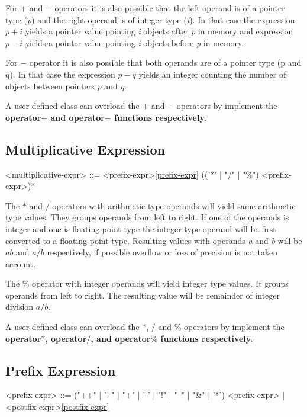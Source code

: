 \documentclass[a4paper,oneside,11pt]{article}
\begin{document}
For $+$ and $-$ operators it is also possible that the left operand is of a pointer type (\emph{p}) and the right operand is of integer type (\emph{i}).
In that case the expression $p+i$ yields a pointer value pointing \emph{i} objects after \emph{p} in memory and
expression $p-i$ yields a pointer value pointing \emph{i} objects before \emph{p} in memory.

For $-$ operator it is also possible that both operands are of a pointer type (p and q).
In that case the expression $p-q$ yields an integer counting the number of objects between pointers \emph{p} and \emph{q}.

A user-defined class can overload the $+$ and $-$ operators by implement
the \bf{operator$+$} and \bf{operator$-$} functions respectively.

\subsection{Multiplicative Expression}

\begin{grammar}
\label{multiplicative-expr}<multiplicative-expr> ::= <prefix-expr>\ref{prefix-expr} (('*' | "/" | "\%") <prefix-expr>)*
\end{grammar}

The $*$ and $/$ operators with arithmetic type operands will yield same arithmetic type values. They groups operands from left to right.
If one of the operands is integer and one is floating-point type the integer type operand will be first converted to a floating-point type.
Resulting values with operands \emph{a} and \emph{b} will be $a b$ and $a / b$ respectively,
if possible overflow or loss of precision is not taken account.

The $\%$ operator with integer operands will yield integer type values. It groups operands from left to right.
The resulting value will be remainder of integer division $a / b$.

A user-defined class can overload the $*$, $/$ and $\%$ operators by implement the \bf{operator$*$}, \bf{operator$/$}, and \bf{operator$\%$}
functions respectively.

\subsection{Prefix Expression}

\begin{grammar}
\label{prefix-expr}<prefix-expr> ::= ("++" | "--" | "+" | '-' | "!" | "~" | "\&" | '*') <prefix-expr> | <postfix-expr>\ref{postfix-expr}
\end{grammar}
\end{document}
